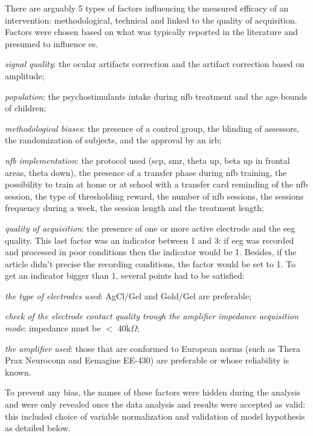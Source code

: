 There are arguably 5 types of factors influencing the measured efficacy of an intervention: methodological, technical and linked to the quality of acquisition.
Factors were chosen based on what was typically reported in the literature and presumed to influence \gls{es}.
\begin{description}
\item \textit{signal quality}: the ocular artifacts correction and the artifact correction based on amplitude; 
\item \textit{population}: the psychostimulants intake during \gls{nfb} treatment and the age bounds of children;
\item \textit{methodological biases}: the presence of a control group, the blinding of assessors, 
the randomization of subjects, and the approval by an \gls{irb};
\item \textit{\gls{nfb} implementation}: the protocol used (\gls{scp}, \gls{smr}, 
theta up, beta up in frontal areas, theta down), the presence of a transfer phase during \gls{nfb} training, the possibility to train at home 
or at school with a transfer card reminding of the \gls{nfb} session, 
the type of thresholding reward, the number of \gls{nfb} sessions, the sessions frequency during a week, the session length and the treatment length;
\item \textit{quality of acquisition}: the presence of one or more active electrode and the \gls{eeg} quality. 
This last factor was an indicator between 1 and 3: if \gls{eeg} was recorded and processed in poor conditions then the indicator would be 1. 
Besides, if the article didn't precise the recording conditions, the factor would be set to 1. To get an indicator bigger than 1, several 
points had to be satisfied:
\begin{description}
\item \textit{the type of electrodes used}: AgCl/Gel and Gold/Gel are preferable;
\item \textit{check of the electrode contact quality trough the amplifier impedance acquisition mode}: impedance must be $<$ 40k$\Omega$;  
\item \textit{the amplifier used}: those that are conformed to European norms (such as Thera Prax \textregistered 
Neuroconn and Eemagine EE-430) are preferable or whose reliability is known.
\end{description}
\end{description}

To prevent any bias, the names of these factors were hidden during the analysis and were only revealed once the data 
analysis and results were accepted as valid: this included choice of variable
normalization and validation of model hypothesis as detailed below.


